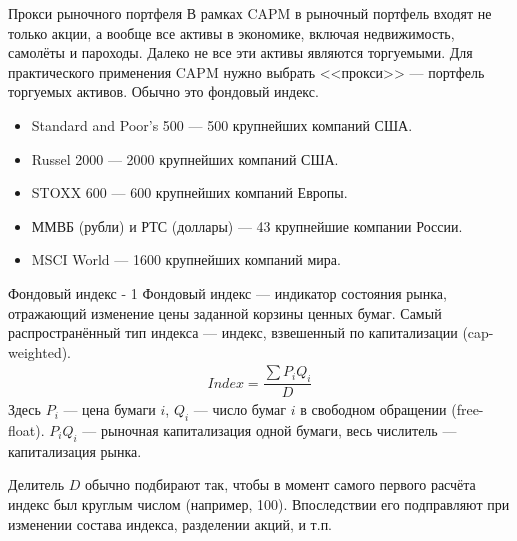 \documentclass{beamer}
\begin{document}
\begin{frame}{Прокси рыночного портфеля}
\justify
В рамках CAPM в рыночный портфель входят не только акции, а вообще все активы в экономике, включая недвижимость, самолёты и пароходы. Далеко не все эти активы являются торгуемыми. Для практического применения CAPM нужно выбрать <<прокси>> --- портфель торгуемых активов. Обычно это фондовый индекс.

\vspace{\baselineskip}
\begin{itemize}
\justifying
\item Standard and Poor's 500 --- 500 крупнейших компаний США.
\item Russel 2000 --- 2000 крупнейших компаний США.
\item STOXX 600 --- 600 крупнейших компаний Европы.
\item ММВБ (рубли) и РТС (доллары) --- 43 крупнейшие компании России.
\item MSCI World --- 1600 крупнейших компаний мира.
\end{itemize}
\end{frame}



\begin{frame}{Фондовый индекс - 1}
\justify
Фондовый индекс --- индикатор состояния рынка, отражающий изменение цены 
заданной корзины ценных бумаг. Самый распространённый тип индекса --- индекс, 
взвешенный по капитализации (cap-weighted).
\begin{align*}
Index = \dfrac{\sum P_iQ_i}{D}
\end{align*}
Здесь $P_i$ --- цена бумаги $i$, $Q_i$ --- число бумаг $i$ в свободном 
обращении (free-float). $P_iQ_i$ --- рыночная капитализация одной бумаги,
весь числитель --- капитализация рынка.

\justify
Делитель $D$ обычно подбирают так, чтобы в момент самого первого расчёта индекс 
был круглым числом (например, 100). Впоследствии его подправляют при изменении 
состава индекса, разделении акций, и т.п.
\end{frame}
\end{document}
